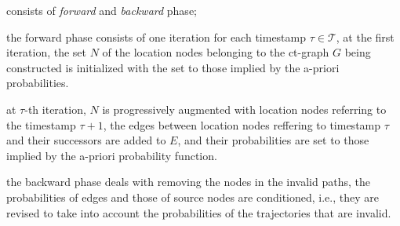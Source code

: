 \begin{frame}
\begin{columns}
  \begin{sitemize}
    \item consists of \emph{forward} and \emph{backward} phase;
    \item the forward phase consists of one iteration for each timestamp $\tau \in \mathcal{T}$, at the first iteration, the set $N$ of the location nodes belonging to the ct-graph $G$ being constructed is initialized with the set to those implied by the a-priori probabilities.
    \item at $\tau$-th iteration, $N$ is progressively augmented with location nodes referring to the timestamp $\tau+1$, the edges between location nodes reffering to timestamp $\tau$ and their successors are added to $E$, and their probabilities are set to those implied by the a-priori probability function.
    \item the backward phase deals with removing the nodes in the invalid paths, the probabilities of edges and those of source nodes are conditioned, i.e., they are revised to take into account the probabilities of the trajectories that are invalid.
  \end{sitemize}

\end{columns}

\end{frame}


